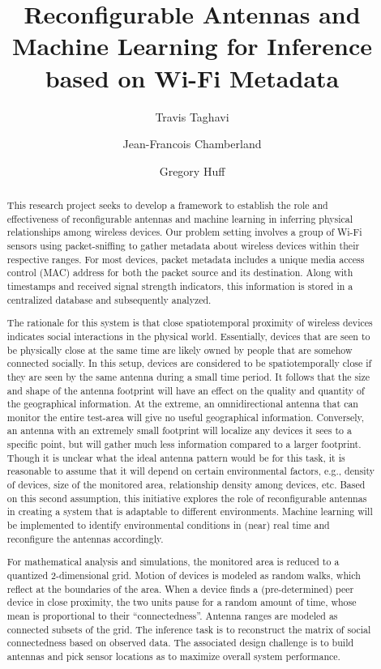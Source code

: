 \documentclass{ursi2015}
\title{Reconfigurable Antennas and Machine Learning for Inference based on Wi-Fi Metadata}
\author[org1]{Travis Taghavi}
\author[org1]{Jean-Francois Chamberland}
\author[org1]{Gregory Huff}
\begin{document}
\begin{abstract}

This research project seeks to develop a framework to establish the role and effectiveness of reconfigurable antennas and machine learning in inferring physical relationships among wireless devices.
Our problem setting involves a group of Wi-Fi sensors using packet-sniffing to gather metadata about wireless devices within their respective ranges.
For most devices, packet metadata includes a unique media access control (MAC) address for both the packet source and its destination.
Along with timestamps and received signal strength indicators, this information is stored in a centralized database and subsequently analyzed.

The rationale for this system is that close spatiotemporal proximity of wireless devices indicates social interactions in the physical world.
Essentially, devices that are seen to be physically close at the same time are likely owned by people that are somehow connected socially.
In this setup, devices are considered to be spatiotemporally close if they are seen by the same antenna during a small time period.
It follows that the size and shape of the antenna footprint will have an effect on the quality and quantity of the geographical information.
At the extreme, an omnidirectional antenna that can monitor the entire test-area will give no useful geographical information.
Conversely, an antenna with an extremely small footprint will localize any devices it sees to a specific point, but will gather much less information compared to a larger footprint.
Though it is unclear what the ideal antenna pattern would be for this task, it is reasonable to assume that it will depend on certain environmental factors, e.g., density of devices, size of the monitored area, relationship density among devices, etc.
Based on this second assumption, this initiative explores the role of reconfigurable antennas in creating a system that is adaptable to different environments.
Machine learning will be implemented to identify environmental conditions in (near) real time and reconfigure the antennas accordingly.

For mathematical analysis and simulations, the monitored area is reduced to a quantized 2-dimensional grid.
Motion of devices is modeled as random walks, which reflect at the boundaries of the area.
When a device finds a (pre-determined) peer device in close proximity, the two units pause for a random amount of time, whose mean is proportional to their ``connectedness''.
Antenna ranges are modeled as connected subsets of the grid.
The inference task is to reconstruct the matrix of social connectedness based on observed data.
The associated design challenge is to build antennas and pick sensor locations as to maximize overall system performance.

\end{abstract}
\end{document}
